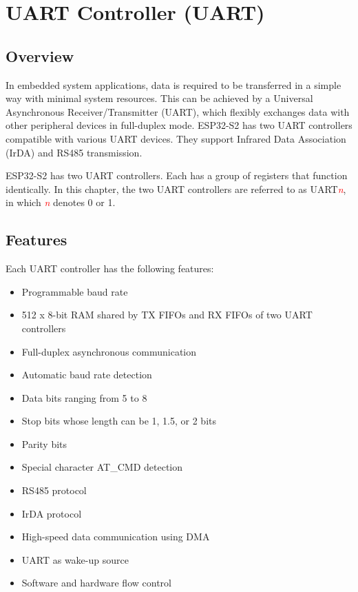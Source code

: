 \documentclass[main\_\_EN.tex]{subfiles}
\begin{document}

\ifglobal
\else
    {\let\clearpage\relax \listoftodos}
    {\let\clearpage\relax \listofdonetodos}
    \tableofcontents
\fi



\hypertarget{uart}{}
\chapter{UART Controller (UART)}
\label{mod:uart}

\section{Overview}

In embedded system applications, data is required to be transferred in a simple way with minimal system resources. This can be achieved by a Universal Asynchronous Receiver/Transmitter (UART), which flexibly exchanges data with other peripheral devices in full-duplex mode. ESP32-S2 has two UART controllers compatible with various UART devices. They support Infrared Data Association (IrDA) and RS485 transmission.

ESP32-S2 has two UART controllers. Each has a group of registers that function identically. In this chapter, the two UART controllers are referred to as UART\textcolor{red}{\it{n}}, in which \textcolor{red}{\it{n}}  denotes 0 or 1.

\section{Features}
Each UART controller has the following features:
\begin{itemize}
    \item Programmable baud rate
    \item 512 x 8-bit RAM shared by TX FIFOs and RX FIFOs of two UART controllers
    \item Full-duplex asynchronous communication
    \item Automatic baud rate detection
    \item Data bits ranging from 5 to 8
    \item Stop bits whose length can be 1, 1.5, or 2 bits
    \item Parity bits
    \item Special character AT\_CMD detection
    \item RS485 protocol
    \item IrDA protocol
    \item High-speed data communication using DMA
    \item UART as wake-up source
    \item Software and hardware flow control
\end{itemize}
\end{document}
